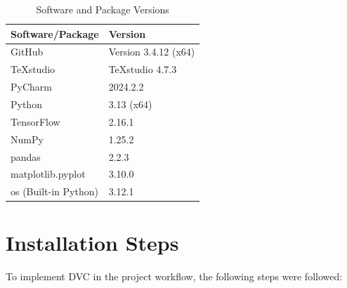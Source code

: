 \begin{table}[h!]
	\centering
	\caption{Software and Package Versions}
	\label{tab:software-versions}
	\begin{tabular}{|l|l|}
		\hline
		\textbf{Software/Package} & \textbf{Version} \\
		\hline
		GitHub                   & Version 3.4.12 (x64) \\
		TeXstudio                & TeXstudio 4.7.3     \\
		PyCharm                  & 2024.2.2            \\
		Python                   & 3.13  (x64)             \\
		TensorFlow               & 2.16.1              \\
		NumPy                    & 1.25.2              \\
		pandas                   & 2.2.3               \\
		matplotlib.pyplot        & 3.10.0               \\
		os (Built-in Python)     & 3.12.1             \\
		\hline
	\end{tabular}
\end{table}

\section{Installation Steps}

To implement DVC in the project workflow, the following steps were followed:

